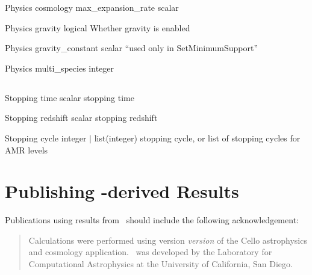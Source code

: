 \documentclass{article}
\begin{document}
\Parameter
{Physics}
{cosmology}
{max\_expansion\_rate}
{scalar}
{}
{}
{}
{}

\Parameter
{Physics}
{}
{gravity}
{logical}
{}
{Whether gravity is enabled}
{}
{}

\Parameter
{Physics}
{}
{gravity\_constant}
{scalar}
{}
{``used only in SetMinimumSupport''}
{}
{}

\Parameter
{Physics}
{}
{multi\_species}
{integer}
{}
{}
{}
{}

\subsection{}

\Parameter
{Stopping}
{}
{time}
{scalar}
{}
{stopping time}
{}
{}

\Parameter
{Stopping}
{}
{redshift}
{scalar}
{}
{stopping redshift}
{}
{}
{}

\Parameter
{Stopping}
{}
{cycle}
{integer $|$ list(integer)}
{}
{stopping cycle, or list of stopping cycles for AMR levels}
{}


\section{Publishing \cello-derived Results}

Publications using results from \cello\ should include the following
acknowledgement:

\begin{quotation}
Calculations were performed using version \textit{version} of the
Cello astrophysics and cosmology application.  \cello\ was developed
by the Laboratory for Computational Astrophysics at the University of
California, San Diego.
\end{quotation}
\end{document}
